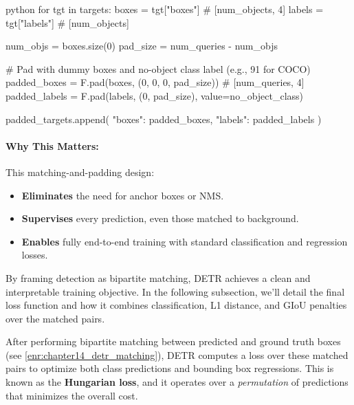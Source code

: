 \begin{enrichment}
\begin{enrichment}
\begin{mintedbox}[bgcolor=black!3, fontsize=\small, linenos]{python}
			for tgt in targets:
			boxes  = tgt["boxes"]   # [num_objects, 4]
			labels = tgt["labels"]  # [num_objects]
			
			num_objs = boxes.size(0)
			pad_size = num_queries - num_objs
			
			# Pad with dummy boxes and no-object class label (e.g., 91 for COCO)
			padded_boxes  = F.pad(boxes,  (0, 0, 0, pad_size))  # [num_queries, 4]
			padded_labels = F.pad(labels, (0, pad_size), value=no_object_class)
			
			padded_targets.append({
				"boxes": padded_boxes,
				"labels": padded_labels
			})
		\end{mintedbox}
		
		\paragraph{Why This Matters:}
		This matching-and-padding design:
		
		\begin{itemize}
			\item \textbf{Eliminates} the need for anchor boxes or NMS.
			\item \textbf{Supervises} every prediction, even those matched to background.
			\item \textbf{Enables} fully end-to-end training with standard classification and regression losses.
		\end{itemize}
		
		\noindent
		By framing detection as bipartite matching, DETR achieves a clean and interpretable training objective. In the following subsection, we’ll detail the final loss function and how it combines classification, L1 distance, and GIoU penalties over the matched pairs.
		
	\end{enrichment}
	
	\begin{enrichment}
		 \label{enr:chapter14_detr_loss}
		 
		 \noindent
		 After performing bipartite matching between predicted and ground truth boxes (see \autoref{enr:chapter14_detr_matching}), DETR computes a loss over these matched pairs to optimize both class predictions and bounding box regressions. This is known as the \textbf{Hungarian loss}, and it operates over a \emph{permutation} of predictions that minimizes the overall cost.
		 

\end{enrichment}
\end{enrichment}

